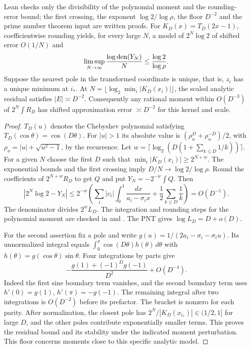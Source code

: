 \documentclass[11pt]{article}
\begin{document}
\begin{theorem}\label{th:cheb}
Lean checks only the divisibility of the polynomial moment and the rounding-error bound; the first crossing, the exponent $\log2/\log\rho$, the floor $D^{-2}$ and the prime number theorem input are written proofs.
For $K_D(x)=T_D(2x-1)$, coefficientwise rounding yields, for every large $N$, a model of $2^N\log 2$ of shifted error $O(1/N)$ and
\[
 \limsup_{N\to\infty}\frac{\log\operatorname{den}(Y_N)}{N}\le\frac{\log 2}{\log\rho}.
\]
Suppose the nearest pole in the transformed coordinate is unique, that is, $z_i$ has a unique minimum at $i_*$. At $N=\lfloor\log_2\min_i|K_D(x_i)|\rfloor$, the scaled analytic residual satisfies $|E|\asymp D^{-2}$. Consequently any rational moment within $O(D^{-3})$ of $2^N\int R_D$ has shifted approximation error $\asymp D^{-2}$ for this kernel and scale.
\end{theorem}
\begin{proof}
$T_D(u)$ denotes the Chebyshev polynomial satisfying $T_D(\cos\theta)=\cos(D\theta)$. For $|u|>1$ its absolute value is $(\rho_u^D+\rho_u^{-D})/2$, with $\rho_u=|u|+\sqrt{u^2-1}$, by the recurrence. Let $w=\lceil\log_2(D(1+\sum_{k\le D}1/k))\rceil$. For a given $N$ choose the first $D$ such that $\min_i |K_D(x_i)|\ge2^{N+w}$. The exponential bounds and the first crossing imply $D/N\to\log 2/\log\rho$. Round the coefficients of $2^{N+w}R_D$ to get $Q$ and put $Y_N=-2^{-w}\int Q$. Then
\[
 |2^N\log 2-Y_N|
 \le 2^{-w}\left(\sum_i |c_i|\int_0^1\frac{dx}{a_i-\sigma_i x}
                      +\frac12\sum_{k\le D}\frac1k\right)=O(D^{-1}).
\]
The denominator divides $2^w L_D$. The integration and rounding steps for the polynomial moment are checked in
 and
.
The PNT gives $\log L_D=D+o(D)$.

For the second assertion fix a pole and write $g(u)=1/(2a_i-\sigma_i-\sigma_i u)$. Its unnormalized integral equals $\int_0^\pi\cos(D\theta)h(\theta)\,d\theta$ with $h(\theta)=g(\cos\theta)\sin\theta$. Four integrations by parts give
\[
 -\frac{g(1)+(-1)^D g(-1)}{D^2}+O(D^{-4}).
\]
Indeed the first sine boundary term vanishes, and the second boundary term uses $h'(0)=g(1)$, $h'(\pi)=-g(-1)$. The remaining integral after two integrations is $O(D^{-2})$ before its prefactor. The bracket is nonzero for each parity. After normalization, the closest pole has $2^N/|K_D(x_{i_*})|\in(1/2,1]$ for large $D$, and the other poles contribute exponentially smaller terms. This proves the residual bound and its stability under the indicated moment perturbation. This floor concerns moments close to this specific analytic model.
\end{proof}
\end{document}
